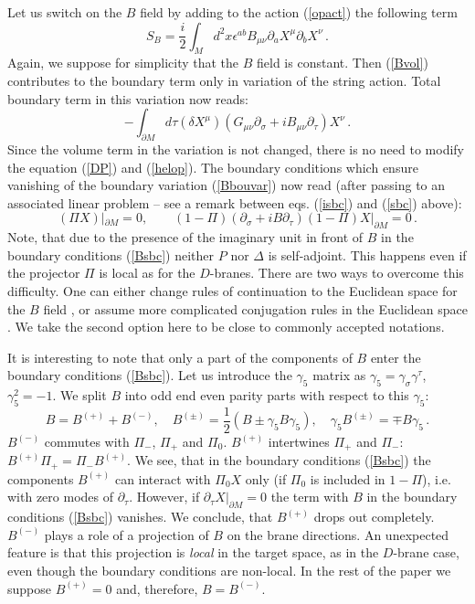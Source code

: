 \documentclass[a4paper,12pt,twoside]{article}
\begin{document}
Let us switch on the $B$ field by adding to the
action (\ref{opact}) the following term
\begin{equation}
S_B=\frac i2 \int_M d^2x \epsilon^{ab}B_{\mu\nu}
\partial_a X^\mu \partial_b X^\nu \,.\label{Bvol}
\end{equation}
Again, we suppose for simplicity that the $B$ field is constant.
Then (\ref{Bvol}) contributes to the boundary term only in variation
of the string action. Total boundary term in this variation now
reads:
\begin{equation}
-\int_{\partial M} d\tau (\delta X^\mu)(G_{\mu\nu}\partial_\sigma
+iB_{\mu\nu}\partial_\tau )X^\nu \,.\label{Bbouvar} 
\end{equation}
Since the volume term in the variation is not changed, there is no
need to modify the equation (\ref{DP}) and (\ref{helop}). The boundary
conditions which ensure vanishing of the boundary variation (\ref{Bbouvar})
now read (after passing to an associated linear problem -- see
a remark between eqs. (\ref{isbc}) and (\ref{sbc}) above):
\begin{equation}
(\Pi X)|_{\partial M}=0,\qquad 
(1-\Pi)(\partial_\sigma +iB\partial_\tau ) 
(1-\Pi )X |_{\partial M}=0 \,.\label{Bsbc}
\end{equation}
Note, that due to the presence of the imaginary unit in front
of $B$ in the boundary conditions (\ref{Bsbc}) neither $P$ nor
$\Delta$ is self-adjoint. This happens even if the projector
$\Pi$ is local as for the $D$-branes. There are two ways to overcome
this difficulty. One can either change rules of continuation to
the Euclidean space for the $B$ field \cite{Kummer:2000ae}, or
assume more complicated conjugation rules in the Euclidean space
\cite{Osborn:1991gm}. We take the second option here to be close
to commonly accepted notations.

It is interesting to note that only a part of the components
of $B$ enter the boundary conditions (\ref{Bsbc}). Let us introduce
the $\gamma_5$ matrix as $\gamma_5=\gamma_\sigma \gamma^\tau$,
$\gamma_5^2=-1$. We split $B$ into odd end even parity parts
with respect to this $\gamma_5$:
\begin{equation}
B=B^{(+)}+B^{(-)},\quad B^{(\pm)}=\frac 12 (B\pm\gamma_5 B\gamma_5),
\quad \gamma_5 B^{(\pm)}=\mp B\gamma_5 \,.\label{oddeven}
\end{equation} 
$B^{(-)}$ commutes with $\Pi_-$, $\Pi_+$ and $\Pi_0$.
$B^{(+)}$ intertwines $\Pi_+$ and $\Pi_-$: $B^{(+)}\Pi_+=\Pi_-B^{(+)}$.
We see, that in the boundary conditions (\ref{Bsbc}) the
components $B^{(+)}$ can interact with $\Pi_0X$ only (if $\Pi_0$ is
included in $1-\Pi$), i.e. with zero modes of $\partial_\tau$.
However, if $\partial_\tau X|_{\partial M}=0$ the term with $B$
in the boundary conditions (\ref{Bsbc}) vanishes. We conclude,
that $B^{(+)}$ drops out completely. $B^{(-)}$ plays a role
of a projection of $B$ on the brane directions. An unexpected feature is
that this projection is {\it local} in the target space, as
in the $D$-brane case, even though the boundary conditions
are non-local. In the rest of the paper we suppose $B^{(+)}=0$
and, therefore, $B=B^{(-)}$.
\end{document}
